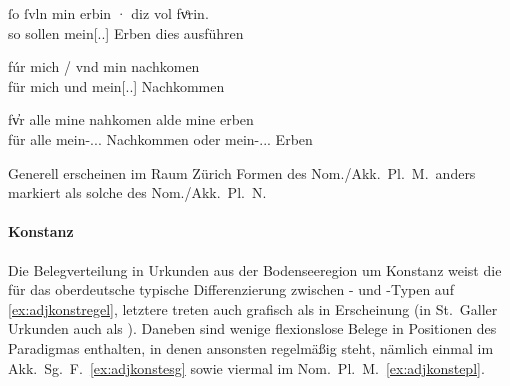 \begin{exe}
\ex \label{ex:adjzuer0}
	\begin{xlist}
	\ex \label{ex:adjzuer0_1}
		\gll ſo ſvln min erbin · diz {vol fvͦrin.} \\
			so sollen mein[\Nom.\Pl.\MascA] Erben {} dies ausführen \\
		\begin{taggedline}{\parencites(Zürich, 1251)[\pno~19,~28.20]{cao1}}
		\trans {}
		\end{taggedline}

	\ex \label{ex:adjzuer0_2}
		\gll fúr mich / vnd min nachkomen \\
			für mich {} und mein[\Acc.\Pl.\MascA] Nachkommen \\
		\begin{taggedline}{\parencites(Zürich, 1294)[\pno~2051~A, 278.25--26]{cao3}}
		\trans {}
		\end{taggedline}

	\ex \label{ex:adjzuer0_3}
		\gll fv̓r alle mine nahkomen alde mine erben \\
			für alle mein-\Acc.\Pl.\MascA.\St{} Nachkommen oder
				mein-\Acc.\Pl.\MascA.\St{} Erben \\
		\begin{taggedline}{\parencites(Eschenbach, Kt.~Luzern, 1294)[\pno~1982,~239.20--21]{cao3}}
		\trans {}
		\end{taggedline}
	\end{xlist}
\end{exe}

Generell erscheinen im Raum Zürich Formen des Nom./Akk.\ Pl.\ M.\ anders
markiert als solche des Nom./Akk.\ Pl.\ N.

\paragraph{Konstanz}
\label{par:adjkonst}
Die Belegverteilung in Urkunden aus der Bodenseeregion um Konstanz weist die
für das oberdeutsche typische Differenzierung zwischen - und
-Typen auf \cref{ex:adjkonstregel}, letztere treten auch grafisch als
 in Erscheinung (in St.~Galler Urkunden auch als ). Daneben
sind wenige flexionslose Belege in Positionen des Paradigmas enthalten, in
denen ansonsten regelmäßig  steht, nämlich einmal im Akk.\ Sg.\ F.\
\cref{ex:adjkonstesg} sowie viermal im Nom.\ Pl.\ M.\ \cref{ex:adjkonstepl}.

